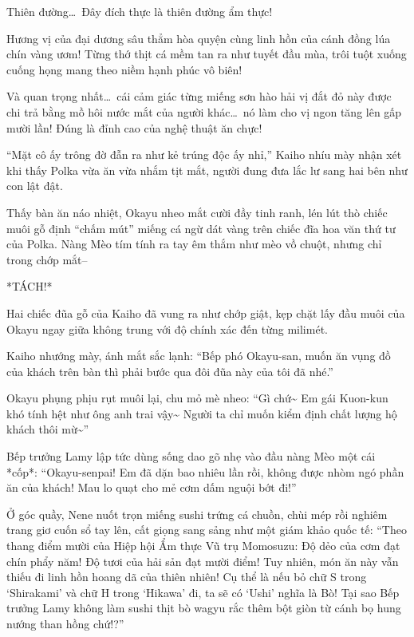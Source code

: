 \documentclass[../main.tex]{subfiles}
\begin{document}

Thiên đường\dots\ Đây đích thực là thiên đường ẩm thực!

Hương vị của đại dương sâu thẳm hòa quyện cùng linh hồn của cánh đồng lúa chín vàng ươm! Từng thớ thịt cá mềm tan ra như tuyết đầu mùa, trôi tuột xuống cuống họng mang theo niềm hạnh phúc vô biên!

Và quan trọng nhất\dots\ cái cảm giác từng miếng sơn hào hải vị đắt đỏ này được chi trả bằng mồ hôi nước mắt của người khác\dots\ nó làm cho vị ngon tăng lên gấp mười lần! Đúng là đỉnh cao của nghệ thuật ăn chực!

\pov{-}

``Mặt cô ấy trông đờ đẫn ra như kẻ trúng độc ấy nhỉ,'' Kaiho nhíu mày nhận xét khi thấy Polka vừa ăn vừa nhắm tịt mắt, người đung đưa lắc lư sang hai bên như con lật đật.

Thấy bàn ăn náo nhiệt, Okayu nheo mắt cười đầy tinh ranh, lén lút thò chiếc muôi gỗ định ``chấm mút'' miếng cá ngừ dát vàng trên chiếc đĩa hoa văn thứ tư của Polka. Nàng Mèo tím tính ra tay êm thắm như mèo vồ chuột, nhưng chỉ trong chớp mắt--

*TÁCH!*

Hai chiếc đũa gỗ của Kaiho đã vung ra như chớp giật, kẹp chặt lấy đầu muôi của Okayu ngay giữa không trung với độ chính xác đến từng milimét.

Kaiho nhướng mày, ánh mắt sắc lạnh: ``Bếp phó Okayu-san, muốn ăn vụng đồ của khách trên bàn thì phải bước qua đôi đũa này của tôi đã nhé.''

Okayu phụng phịu rụt muôi lại, chu mỏ mè nheo: ``Gì chứ\~{} Em gái Kuon-kun khó tính hệt như ông anh trai vậy\~{} Người ta chỉ muốn kiểm định chất lượng hộ khách thôi mừ\~{}''

Bếp trưởng Lamy lập tức dùng sống dao gõ nhẹ vào đầu nàng Mèo một cái *cốp*: ``Okayu-senpai! Em đã dặn bao nhiêu lần rồi, không được nhòm ngó phần ăn của khách! Mau lo quạt cho mẻ cơm dấm nguội bớt đi!''

Ở góc quầy, Nene nuốt trọn miếng sushi trứng cá chuồn, chùi mép rồi nghiêm trang giơ cuốn sổ tay lên, cất giọng sang sảng như một giám khảo quốc tế: ``Theo thang điểm mười của Hiệp hội Ẩm thực Vũ trụ Momosuzu: Độ dẻo của cơm đạt chín phẩy năm! Độ tươi của hải sản đạt mười điểm! Tuy nhiên, món ăn này vẫn thiếu đi linh hồn hoang dã của thiên nhiên! Cụ thể là nếu bỏ chữ S trong `Shirakami' và chữ H trong `Hikawa' đi, ta sẽ có `Ushi' nghĩa là Bò! Tại sao Bếp trưởng Lamy không làm sushi thịt bò wagyu rắc thêm bột giòn từ cánh bọ hung nướng than hồng chứ!?''
\end{document}
